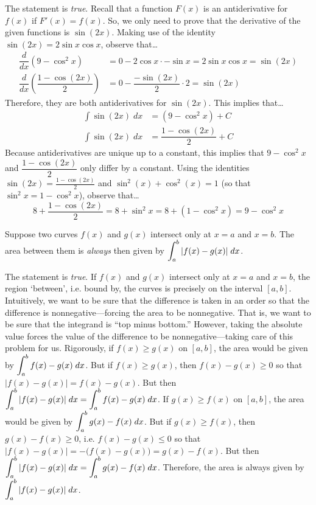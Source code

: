 \documentclass[11pt,letterpaper]{article}
\begin{document}
\sol The statement is \textit{true}. Recall that a function $F(x)$ is an antiderivative for $f(x)$ if $F'(x)= f(x)$. So, we only need to prove that the derivative of the given functions is $\sin(2x)$. Making use of the identity $\sin(2x)= 2 \sin x \cos x$, observe that\dots
	\[
	\begin{aligned}
	\dfrac{d}{dx} (9 - \cos^2 x)&= 0 - 2 \cos x \cdot -\sin x= 2 \sin x \cos x= \sin(2x) \\[0.3cm]
	\dfrac{d}{dx} \left( \dfrac{1 - \cos(2x)}{2} \right)&= 0 - \dfrac{-\sin(2x)}{2} \cdot 2= \sin(2x)
	\end{aligned}
	\]
Therefore, they are both antiderivatives for $\sin(2x)$. This implies that\dots
	\[
	\begin{aligned}
	\int \sin(2x) \;dx&= (9 - \cos^2 x) + C \\[0.3cm]
	\int \sin(2x) \;dx&= \dfrac{1 - \cos(2x)}{2} + C
	\end{aligned}
	\]
Because antiderivatives are unique up to a constant, this implies that $9 - \cos^2 x$ and $\dfrac{1 - \cos(2x)}{2}$ only differ by a constant. Using the identities $\sin(2x)= \frac{1 - \cos(2x)}{2}$ and $\sin^2(x) + \cos^2(x)= 1$ (so that $\sin^2 x= 1 - \cos^2 x$), observe that\dots
	\[
	8 + \dfrac{1 - \cos(2x)}{2}= 8 + \sin^2 x= 8 + (1 - \cos^2 x)= 9 - \cos^2 x
	\] \pvspace{1.3cm}



 Suppose two curves $f(x)$ and $g(x)$ intersect only at $x= a$ and $x= b$. The area between them is \textit{always} then given by $\displaystyle\int_a^b |f(x) - g(x)| \;dx$. \pspace

\sol The statement is \textit{true}. If $f(x)$ and $g(x)$ intersect only at $x= a$ and $x= b$, the region `between', i.e. bound by, the curves is precisely on the interval $[a, b]$. Intuitively, we want to be sure that the difference is taken in an order so that the difference is nonnegative---forcing the area to be nonnegative. That is, we want to be sure that the integrand is ``top minus bottom.'' However, taking the absolute value forces the value of the difference to be nonnegative---taking care of this problem for us. Rigorously, if $f(x) \geq g(x)$ on $[a, b]$, the area would be given by $\displaystyle\int_a^b f(x) - g(x) \;dx$. But if $f(x) \geq g(x)$, then $f(x) - g(x) \geq 0$ so that $|f(x) - g(x)|= f(x) - g(x)$. But then $\displaystyle\int_a^b |f(x) - g(x)| \;dx= \int_a^b f(x) - g(x) \;dx$. If $g(x) \geq f(x)$ on $[a, b]$, the area would be given by $\displaystyle\int_a^b g(x) - f(x) \;dx$. But if $g(x) \geq f(x)$, then $g(x) - f(x) \geq 0$, i.e. $f(x) - g(x) \leq 0$ so that $|f(x) - g(x)|= -\big( f(x) - g(x) \big)= g(x) - f(x)$. But then $\displaystyle\int_a^b |f(x) - g(x)| \;dx= \int_a^b g(x) - f(x) \;dx$. Therefore, the area is always given by $\displaystyle\int_a^b |f(x) - g(x)| \;dx$. \pvspace{1.3cm}
\end{document}
